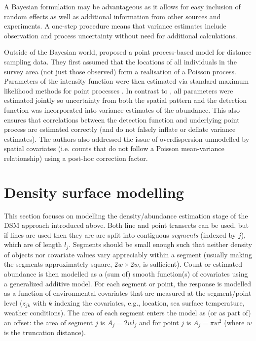 \documentclass[a4paper,12pt]{article}
\begin{document}
A Bayesian formulation may be advantageous as it allows for easy inclusion of random effects as well as additional information from other sources and experiments. A one-step procedure means that variance estimates include observation and process uncertainty without need for additional calculations.

Outside of the Bayesian world, \cite{Johnson:2010gf} proposed a point process-based model for distance sampling data. They first assumed that the locations of all individuals in the survey area (not just those observed) form a realisation of a Poisson process. Parameters of the intensity function were then estimated via standard maximum likelihood methods for point processes \citep{Baddeley:2000to}. In contrast to \cite{Hedley:2004et}, all parameters were estimated jointly so uncertainty from both the spatial pattern and the detection function was incorporated into variance estimates of the abundance. This also ensures that correlations between the detection function and underlying point process are estimated correctly (and do not falsely inflate or deflate variance estimates). The authors also addressed the issue of overdispersion unmodelled by spatial covariates (i.e. counts that do not follow a Poisson mean-variance relationship) using a post-hoc correction factor.


\section*{Density surface modelling}
\label{s:dsm}

This section focuses on modelling the density/abundance estimation stage of the DSM approach introduced above. Both line and point transects can be used, but if lines are used then they are are split into contiguous \textit{segments} (indexed by $j$), which are of length $l_j$. Segments should be small enough such that neither density of objects nor covariate values vary appreciably within a segment (usually making the segments approximately square, $2w\times 2w$, is sufficient). Count or estimated abundance is then modelled as a (sum of) smooth function(s) of covariates using a generalized additive model. For each segment or point, the response is modelled as a function of environmental covariates that are measured at the segment/point level ($z_{jk}$ with $k$ indexing the covariates, e.g., location, sea surface temperature, weather conditions). The area of each segment enters the model as (or as part of) an offset: the area of segment $j$ is $A_j = 2wl_j$ and for point $j$ is $A_j=\pi w^2$ (where $w$ is the truncation distance). 
\end{document}
